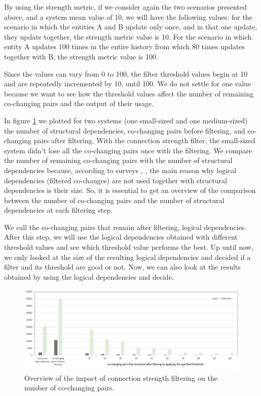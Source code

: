 \documentclass[runningheads]{comsis2}
\begin{document}
By using the strength metric, if we consider again the two scenarios presented above, and a system mean value of 10, we will have the following values: for the scenario in which the entities A and B update only once, and in that one update, they update together, the strength metric value is 10. For the scenario in which entity A updates 100 times in the entire history from which 80 times updates together with B, the strength metric value is 100.  




Since the values can vary from 0 to 100, the filter threshold values begin at 10 and are repeatedly incremented by 10, until 100. We do not settle for one value because we want to see how the threshold values affect the number of remaining co-changing pairs and the output of their usage.

In figure \ref{fig:strength_overview} we plotted for two systems (one small-sized and one medium-sized) the number of structural dependencies, co-changing pairs before filtering, and co-changing pairs after filtering. With the connection strength filter, the small-sized system didn't lose all the co-changing pairs once with the filtering.
We compare the number of remaining co-changing pairs with the number of structural dependencies because, according to surveys \cite{Shtern:2012:CMS:2332427.2332428}, \cite{sar}, the main reason why logical dependencies (filtered co-changes) are not used together with structural dependencies is their size. So, it is essential to get an overview of the comparison between the number of co-changing pairs and the number of structural dependencies at each filtering step.

We call the co-changing pairs that remain after filtering, logical dependencies. 
After this step, we will use the logical dependencies obtained with different threshold values and see which threshold value performs the best. Up until now, we only looked at the size of the resulting logical dependencies and decided if a filter and its threshold are good or not. Now, we can also look at the results obtained by using the logical dependencies and decide.

\begin{figure}
\centering
\includegraphics[width=\textwidth]{strength_overview.PNG}
\caption{Overview of the impact of connection strength filtering on the number of co-changing pairs. }
\label{fig:strength_overview}
\centering
\end{figure}
\end{document}
